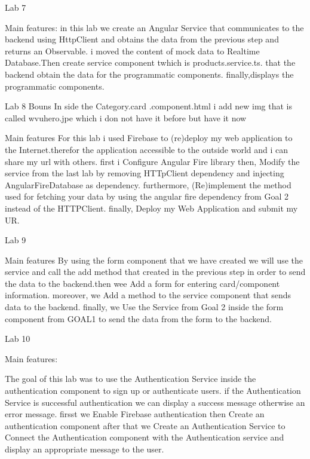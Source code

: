 Lab 7

Main features:
in this lab we create an Angular Service that communicates to the backend using HttpClient and obtains the data from the previous step and returns an Observable. 
i moved the content of mock data to Realtime Database.Then create service component twhich  is products.service.ts. that the backend obtain the data for the programmatic components.
finally,displays the programmatic components.



Lab 8
 Bouns 
 In side the Category.card .component.html i add new img that is called wvuhero.jpe which i don not have it before but have it now 

 Main features
 For this lab i used Firebase to (re)deploy my web application to the Internet.therefor the application accessible to the outside world and i can share my url with others.
first i Configure Angular Fire library then, Modify the service from the last lab by removing HTTpClient dependency and injecting AngularFireDatabase as dependency.
furthermore, (Re)implement the method used for fetching your data by using the angular fire dependency from Goal 2 instead of the HTTPClient.
finally,  Deploy my Web Application and submit my UR.

 Lab 9

 Main features
 By using the form component that we have  created we will use the service and call the add method that created in the previous 
 step in order to send the data to the backend.then wee Add a form for entering card/component information.
moreover, we Add a method to the service component that sends data to the backend. finally, we
Use the Service from Goal 2 inside the form component from GOAL1 to send the data from the form to the backend.


Lab 10

Main features:

The goal of this lab was to use the Authentication Service inside the authentication component to sign up or authenticate users.
if the Authentication Service is successful authentication we can  display a success message otherwise an error message. 
firsst we Enable Firebase authentication then Create an authentication component after that we Create an Authentication Service
to Connect the Authentication component with the Authentication service and display an appropriate message to the user.


